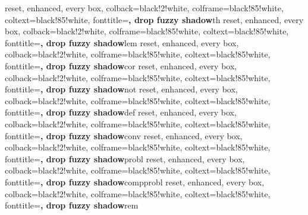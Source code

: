 %
{reset, enhanced, every box,
	colback=black!2!white, colframe=black!85!white, coltext=black!85!white,
	fonttitle=\small\bfseries, drop fuzzy shadow}{th}
%
{reset, enhanced, every box,
	colback=black!2!white, colframe=black!85!white, coltext=black!85!white,
	fonttitle=\small\bfseries, drop fuzzy shadow}{lem}
%
{reset, enhanced, every box,
	colback=black!2!white, colframe=black!85!white, coltext=black!85!white,
	fonttitle=\small\bfseries, drop fuzzy shadow}{cor}
%
{reset, enhanced, every box,
	colback=black!2!white, colframe=black!85!white, coltext=black!85!white,
	fonttitle=\small\bfseries, drop fuzzy shadow}{not}
%
{reset, enhanced, every box,
	colback=black!2!white, colframe=black!85!white, coltext=black!85!white,
	fonttitle=\small\bfseries, drop fuzzy shadow}{def}
%
{reset, enhanced, every box,
	colback=black!2!white, colframe=black!85!white, coltext=black!85!white,
	fonttitle=\small\bfseries, drop fuzzy shadow}{conv}
%
{reset, enhanced, every box,
	colback=black!2!white, colframe=black!85!white, coltext=black!85!white,
	fonttitle=\small\bfseries, drop fuzzy shadow}{probl}
%
{reset, enhanced, every box,
	colback=black!2!white, colframe=black!85!white, coltext=black!85!white,
	fonttitle=\small\bfseries, drop fuzzy shadow}{compprobl}
%
{reset, enhanced, every box,
	colback=black!2!white, colframe=black!85!white, coltext=black!85!white,
	fonttitle=\small\bfseries, drop fuzzy shadow}{rem}
%

